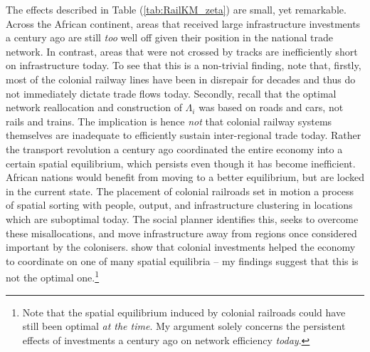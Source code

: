 \documentclass[11pt, oneside]{article}   	%
\let\oldref\ref
\renewcommand{\ref}[1]{(\oldref{#1})}
\begin{document}
The effects described in Table \ref{tab:RailKM_zeta} are small, yet remarkable. Across the African continent, areas that received large infrastructure investments a century ago are still \emph{too} well off given their position in the national trade network. In contrast, areas that were not crossed by tracks are inefficiently short on infrastructure today. To see that this is a non-trivial finding, note that, firstly, most of the colonial railway lines have been in disrepair for decades and thus do not immediately dictate trade flows today. Secondly, recall that the optimal network reallocation and construction of $\Lambda_{i}$ was based on roads and cars, not rails and trains. The implication is hence \emph{not} that colonial railway systems themselves are inadequate to efficiently sustain inter-regional trade today. Rather the transport revolution a century ago coordinated the entire economy into a certain spatial equilibrium, which persists even though it has become inefficient. African nations would benefit from moving to a better equilibrium, but are locked in the current state. The placement of colonial railroads set in motion a process of spatial sorting with people, output, and infrastructure clustering in locations which are suboptimal today. The social planner identifies this, seeks to overcome these misallocations, and move infrastructure away from regions once considered important by the colonisers. \citeauthor{jedwab_permanent_2016} show that colonial investments helped the economy to coordinate on one of many spatial equilibria -- my findings suggest that this is not the optimal one.\footnote{Note that the spatial equilibrium induced by colonial railroads could have still been optimal \emph{at the time}. My argument solely concerns the persistent effects of investments a century ago on network efficiency \emph{today}.}
\end{document}
